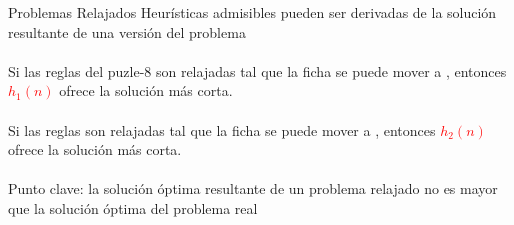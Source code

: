 \begin{frame}{Problemas Relajados}
Heur\'isticas admisibles pueden ser derivadas de la soluci\'on  resultante de una versi\'on  del problema\\~\\

Si las reglas del puzle-8 son relajadas tal que la ficha se puede mover a , entonces \textcolor{red}{$h_{1}(n)$} ofrece la soluci\'on m\'as corta.\\~\\

Si las reglas son relajadas tal que la ficha se puede mover a , entonces \textcolor{red}{$h_{2}(n)$} ofrece la soluci\'on m\'as corta.\\~\\

Punto clave: la soluci\'on \'optima resultante de un problema relajado no es mayor que la soluci\'on \'optima del problema real

\end{frame}
